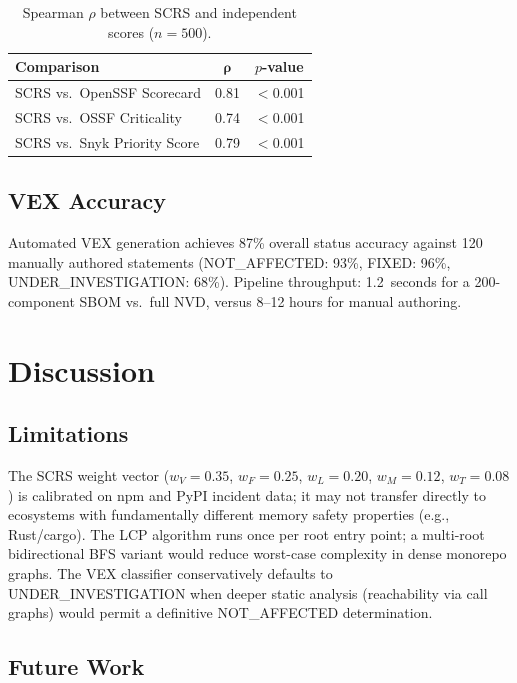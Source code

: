 \documentclass[11pt,twocolumn]{article}
\begin{document}
\begin{table}[h]
\centering
\small
\caption{Spearman $\rho$ between SCRS and independent scores ($n=500$).}
\begin{tabular}{lcc}
\toprule
\textbf{Comparison} & $\boldsymbol{\rho}$ & \textbf{$p$-value} \\
\midrule
SCRS vs.\ OpenSSF Scorecard    & 0.81 & $<$0.001 \\
SCRS vs.\ OSSF Criticality     & 0.74 & $<$0.001 \\
SCRS vs.\ Snyk Priority Score  & 0.79 & $<$0.001 \\
\bottomrule
\end{tabular}
\end{table}

\subsection{VEX Accuracy}

Automated VEX generation achieves 87\% overall status accuracy against 120
manually authored statements (NOT\_AFFECTED: 93\%, FIXED: 96\%,
UNDER\_INVESTIGATION: 68\%). Pipeline throughput: 1.2~seconds for a
200-component SBOM vs.\ full NVD, versus 8--12 hours for manual authoring.

\section{Discussion}

\subsection{Limitations}

The SCRS weight vector ($w_V{=}0.35$, $w_F{=}0.25$, $w_L{=}0.20$,
$w_M{=}0.12$, $w_T{=}0.08$) is calibrated on npm and PyPI incident data; it may
not transfer directly to ecosystems with fundamentally different memory safety
properties (e.g., Rust/cargo). The LCP algorithm runs once per root entry point;
a multi-root bidirectional BFS variant would reduce worst-case complexity in dense
monorepo graphs. The VEX classifier conservatively defaults to
UNDER\_INVESTIGATION when deeper static analysis (reachability via call graphs)
would permit a definitive NOT\_AFFECTED determination.

\subsection{Future Work}
\end{document}
